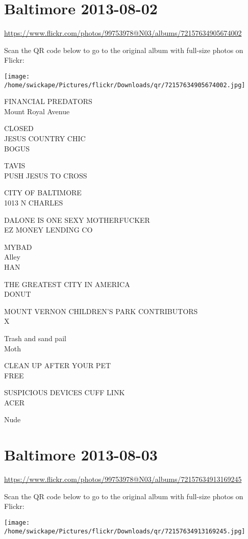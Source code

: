 \documentclass[10pt,letterpaper]{article}
\title{}
\author{}
\date{}
\begin{document}
\section*{Baltimore 2013-08-02}

\url{https://www.flickr.com/photos/99753978@N03/albums/72157634905674002}

Scan the QR code below to go to the original album with full-size photos on Flickr:

\texttt{[image: /home/swickape/Pictures/flickr/Downloads/qr/72157634905674002.jpg]}
\pagebreak

FINANCIAL PREDATORS\\
Mount Royal Avenue

CLOSED\\
JESUS COUNTRY CHIC\\
BOGUS

TAVIS\\
PUSH JESUS TO CROSS

CITY OF BALTIMORE\\
1013 N CHARLES

DALONE IS ONE SEXY MOTHERFUCKER\\
EZ MONEY LENDING CO

MYBAD\\
Alley\\
HAN

THE GREATEST CITY IN AMERICA\\
DONUT

MOUNT VERNON CHILDREN'S PARK CONTRIBUTORS\\
X

Trash and sand pail\\
Moth

CLEAN UP AFTER YOUR PET\\
FREE

SUSPICIOUS DEVICES CUFF LINK\\
ACER

Nude
\pagebreak

\section*{Baltimore 2013-08-03}

\url{https://www.flickr.com/photos/99753978@N03/albums/72157634913169245}

Scan the QR code below to go to the original album with full-size photos on Flickr:

\texttt{[image: /home/swickape/Pictures/flickr/Downloads/qr/72157634913169245.jpg]}
\pagebreak
\end{document}
